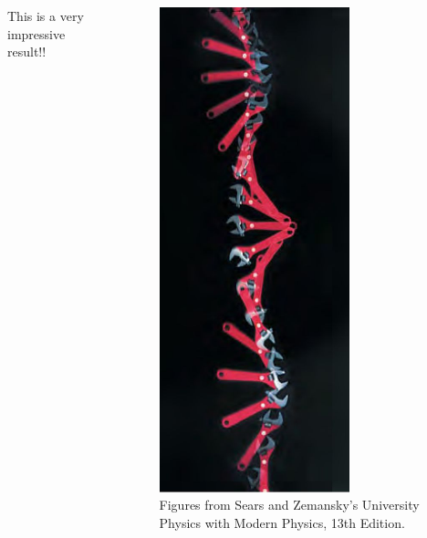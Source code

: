 \documentclass[]{beamer}
\begin{document}
          \begin{frame}
            \begin{columns}[c]
                \column{2in}  %
               
                   

            

This is a  very impressive result!!




            
                  
                \column{2in}
             
            
                \begin{figure}[h!]  
                    \includegraphics[width=0.7\textwidth]{images/11.jpg}
                    \caption{ {\tiny Figures from Sears and Zemansky's University Physics 
                    with Modern Physics, 13th Edition.} }
                  \end{figure}
            

\end{columns}
\end{frame}
\end{document}
